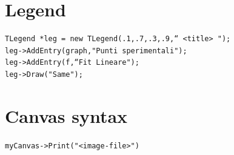 \documentclass[10pt, oneside]{article}
\begin{document}
\section{Legend}
\begin{verbatim}
TLegend *leg = new TLegend(.1,.7,.3,.9,“ <title> "); 
leg->AddEntry(graph,"Punti sperimentali"); 
leg->AddEntry(f,“Fit Lineare"); 
leg->Draw("Same"); 
\end{verbatim}

\section{Canvas syntax}
\texttt{myCanvas->Print("<image-file>")}
\end{document}
